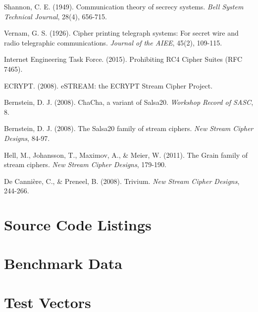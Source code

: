 \documentclass[12pt,a4paper,oneside]{report}
\begin{document}
\begin{thebibliography}{99}

Shannon, C. E. (1949). Communication theory of secrecy systems. \textit{Bell System Technical Journal}, 28(4), 656-715.

Vernam, G. S. (1926). Cipher printing telegraph systems: For secret wire and radio telegraphic communications. \textit{Journal of the AIEE}, 45(2), 109-115.

Internet Engineering Task Force. (2015). Prohibiting RC4 Cipher Suites (RFC 7465).

ECRYPT. (2008). eSTREAM: the ECRYPT Stream Cipher Project.

Bernstein, D. J. (2008). ChaCha, a variant of Salsa20. \textit{Workshop Record of SASC}, 8.

Bernstein, D. J. (2008). The Salsa20 family of stream ciphers. \textit{New Stream Cipher Designs}, 84-97.

Hell, M., Johansson, T., Maximov, A., \& Meier, W. (2011). The Grain family of stream ciphers. \textit{New Stream Cipher Designs}, 179-190.

De Cannière, C., \& Preneel, B. (2008). Trivium. \textit{New Stream Cipher Designs}, 244-266.

\end{thebibliography}

\appendix

\chapter{Source Code Listings}
\label{app:code}


\chapter{Benchmark Data}
\label{app:benchmarks}


\chapter{Test Vectors}
\label{app:testvectors}

\end{document}
